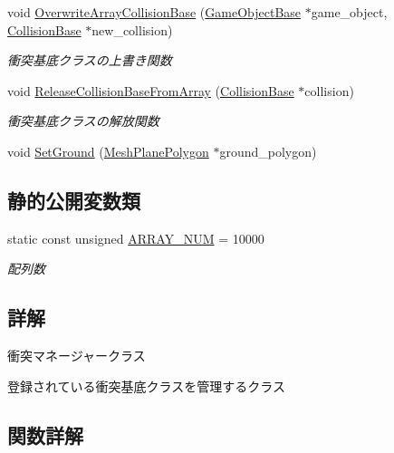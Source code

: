 \begin{DoxyCompactItemize}
void \mbox{\hyperlink{class_collision_manager_af9c2ce87e0189cdd1256c83decc64673}{Overwrite\+Array\+Collision\+Base}} (\mbox{\hyperlink{class_game_object_base}{Game\+Object\+Base}} $\ast$game\+\_\+object, \mbox{\hyperlink{class_collision_base}{Collision\+Base}} $\ast$new\+\_\+collision)
\begin{DoxyCompactList}\small\item\em 衝突基底クラスの上書き関数 \end{DoxyCompactList}\item 
void \mbox{\hyperlink{class_collision_manager_a34318163f4256cebc7aefb95fc475030}{Release\+Collision\+Base\+From\+Array}} (\mbox{\hyperlink{class_collision_base}{Collision\+Base}} $\ast$collision)
\begin{DoxyCompactList}\small\item\em 衝突基底クラスの解放関数 \end{DoxyCompactList}\item 
void \mbox{\hyperlink{class_collision_manager_a63ce6003d8d042085d7b388a4cfa0666}{Set\+Ground}} (\mbox{\hyperlink{class_mesh_plane_polygon}{Mesh\+Plane\+Polygon}} $\ast$ground\+\_\+polygon)
\end{DoxyCompactItemize}
\subsection*{静的公開変数類}
\begin{DoxyCompactItemize}
\item 
static const unsigned \mbox{\hyperlink{class_collision_manager_addbc64e1fa0b01f3be07c897887f44ec}{A\+R\+R\+A\+Y\+\_\+\+N\+UM}} = 10000
\begin{DoxyCompactList}\small\item\em 配列数 \end{DoxyCompactList}\end{DoxyCompactItemize}


\subsection{詳解}
衝突マネージャークラス 

登録されている衝突基底クラスを管理するクラス 

\subsection{関数詳解}
\mbox{\label{class_collision_manager_a42be7a26321110f5daaf1828da32f667}} 
